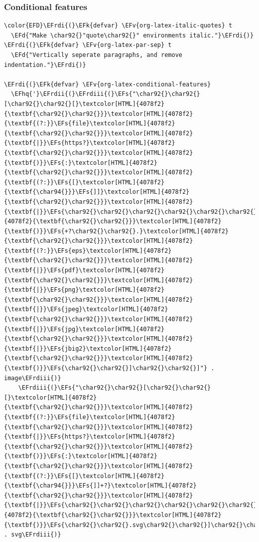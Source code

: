\documentclass{scrartcl}
\newcommand{\EFk}[1]{\textcolor{EFk}{#1}} %
\newcommand{\EFd}[1]{\textcolor{EFd}{\textit{#1}}} %
\newcommand{\EFs}[1]{\textcolor{EFs}{#1}} %
\newcommand{\EFv}[1]{\textcolor{EFv}{#1}} %
\newcommand{\EFhq}[1]{\textcolor{EFhq}{#1}} %
\newcommand{\EFrdi}[1]{\textcolor{EFrdi}{#1}} %
\newcommand{\EFrdii}[1]{\textcolor{EFrdii}{#1}} %
\newcommand{\EFrdiii}[1]{\textcolor{EFrdiii}{#1}} %
\begin{document}
\subsubsection{Conditional features}
\label{sec:orgecfbf64}
\begin{Code}
\begin{Verbatim}[]
\color{EFD}\EFrdi{(}\EFk{defvar} \EFv{org-latex-italic-quotes} t
  \EFd{"Make \char92{}"quote\char92{}" environments italic."}\EFrdi{)}
\EFrdi{(}\EFk{defvar} \EFv{org-latex-par-sep} t
  \EFd{"Vertically seperate paragraphs, and remove indentation."}\EFrdi{)}

\EFrdi{(}\EFk{defvar} \EFv{org-latex-conditional-features}
  \EFhq{'}\EFrdii{(}\EFrdiii{(}\EFs{"\char92{}\char92{}[\char92{}\char92{}[}\textcolor[HTML]{4078f2}{\textbf{\char92{}\char92{}}}\textcolor[HTML]{4078f2}{\textbf{(?:}}\EFs{file}\textcolor[HTML]{4078f2}{\textbf{\char92{}\char92{}}}\textcolor[HTML]{4078f2}{\textbf{|}}\EFs{https?}\textcolor[HTML]{4078f2}{\textbf{\char92{}\char92{}}}\textcolor[HTML]{4078f2}{\textbf{)}}\EFs{:}\textcolor[HTML]{4078f2}{\textbf{\char92{}\char92{}}}\textcolor[HTML]{4078f2}{\textbf{(?:}}\EFs{[}\textcolor[HTML]{4078f2}{\textbf{\char94{}}}\EFs{]]}\textcolor[HTML]{4078f2}{\textbf{\char92{}\char92{}}}\textcolor[HTML]{4078f2}{\textbf{|}}\EFs{\char92{}\char92{}\char92{}\char92{}\char92{}\char92{}]}\textcolor[HTML]{4078f2}{\textbf{\char92{}\char92{}}}\textcolor[HTML]{4078f2}{\textbf{)}}\EFs{+?\char92{}\char92{}.}\textcolor[HTML]{4078f2}{\textbf{\char92{}\char92{}}}\textcolor[HTML]{4078f2}{\textbf{(?:}}\EFs{eps}\textcolor[HTML]{4078f2}{\textbf{\char92{}\char92{}}}\textcolor[HTML]{4078f2}{\textbf{|}}\EFs{pdf}\textcolor[HTML]{4078f2}{\textbf{\char92{}\char92{}}}\textcolor[HTML]{4078f2}{\textbf{|}}\EFs{png}\textcolor[HTML]{4078f2}{\textbf{\char92{}\char92{}}}\textcolor[HTML]{4078f2}{\textbf{|}}\EFs{jpeg}\textcolor[HTML]{4078f2}{\textbf{\char92{}\char92{}}}\textcolor[HTML]{4078f2}{\textbf{|}}\EFs{jpg}\textcolor[HTML]{4078f2}{\textbf{\char92{}\char92{}}}\textcolor[HTML]{4078f2}{\textbf{|}}\EFs{jbig2}\textcolor[HTML]{4078f2}{\textbf{\char92{}\char92{}}}\textcolor[HTML]{4078f2}{\textbf{)}}\EFs{\char92{}\char92{}]\char92{}\char92{}]"} . image\EFrdiii{)}
    \EFrdiii{(}\EFs{"\char92{}\char92{}[\char92{}\char92{}[}\textcolor[HTML]{4078f2}{\textbf{\char92{}\char92{}}}\textcolor[HTML]{4078f2}{\textbf{(?:}}\EFs{file}\textcolor[HTML]{4078f2}{\textbf{\char92{}\char92{}}}\textcolor[HTML]{4078f2}{\textbf{|}}\EFs{https?}\textcolor[HTML]{4078f2}{\textbf{\char92{}\char92{}}}\textcolor[HTML]{4078f2}{\textbf{)}}\EFs{:}\textcolor[HTML]{4078f2}{\textbf{\char92{}\char92{}}}\textcolor[HTML]{4078f2}{\textbf{(?:}}\EFs{[}\textcolor[HTML]{4078f2}{\textbf{\char94{}}}\EFs{]]+?}\textcolor[HTML]{4078f2}{\textbf{\char92{}\char92{}}}\textcolor[HTML]{4078f2}{\textbf{|}}\EFs{\char92{}\char92{}\char92{}\char92{}\char92{}\char92{}]}\textcolor[HTML]{4078f2}{\textbf{\char92{}\char92{}}}\textcolor[HTML]{4078f2}{\textbf{)}}\EFs{\char92{}\char92{}.svg\char92{}\char92{}]\char92{}\char92{}]"} . svg\EFrdiii{)}

\end{Verbatim}
\end{Code}
\end{document}
